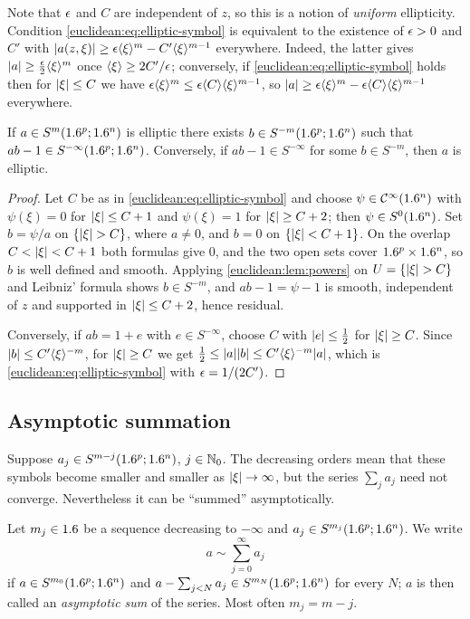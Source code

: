 Note that $\epsilon$ and $C$ are independent of $z$, so this is a notion of
\emph{uniform} ellipticity. Condition \eqref{euclidean:eq:elliptic-symbol} is
equivalent to the existence of $\epsilon>0$ and $C'$ with
$\lvert a(z,\xi)\rvert\ge\epsilon\langle \xi\rangle^m-C'\langle \xi\rangle^{m-1}$ everywhere. Indeed, the
latter gives $\lvert a\rvert\ge\frac{\epsilon}2\langle \xi\rangle^m$ once $\langle \xi\rangle\ge2C'/\epsilon$;
conversely, if \eqref{euclidean:eq:elliptic-symbol} holds then for
$\lvert \xi\rvert\le C$ we have $\epsilon\langle \xi\rangle^m\le\epsilon\langle C\rangle\langle \xi\rangle^{m-1}$, so
$\lvert a\rvert\ge\epsilon\langle \xi\rangle^m-\epsilon\langle C\rangle\langle \xi\rangle^{m-1}$ everywhere.

\begin{lemma}\label{euclidean:lem:elliptic-symbol}
  If $a\in S^m(1.6^p;1.6^n)$ is elliptic there exists
  $b\in S^{-m}(1.6^p;1.6^n)$ such that $ab-1\in S^{-\infty}(1.6^p;1.6^n)$.
  Conversely, if $ab-1\in S^{-\infty}$ for some $b\in S^{-m}$, then $a$ is
  elliptic.
\end{lemma}
\begin{proof}
  Let $C$ be as in \eqref{euclidean:eq:elliptic-symbol} and choose
  $\psi\in\mathcal{C}^\infty(1.6^n)$ with $\psi(\xi)=0$ for $\lvert \xi\rvert\le C+1$ and
  $\psi(\xi)=1$ for $\lvert \xi\rvert\ge C+2$; then $\psi\in S^0(1.6^n)$. Set
  $b=\psi/a$ on $\{\lvert \xi\rvert>C\}$, where $a\ne0$, and $b=0$ on
  $\{\lvert \xi\rvert<C+1\}$. On the overlap $C<\lvert \xi\rvert<C+1$ both formulas give $0$, and
  the two open sets cover $1.6^p\times1.6^n$, so $b$ is well defined and smooth. Applying \cref{euclidean:lem:powers} on
  $U=\{\lvert \xi\rvert>C\}$ and Leibniz' formula shows $b\in S^{-m}$, and
  $ab-1=\psi-1$ is smooth, independent of $z$ and supported in
  $\lvert \xi\rvert\le C+2$, hence residual.

  Conversely, if $ab=1+e$ with $e\in S^{-\infty}$, choose $C$ with
  $\lvert e\rvert\le\frac12$ for $\lvert \xi\rvert\ge C$. Since $\lvert b\rvert\le C'\langle \xi\rangle^{-m}$, for
  $\lvert \xi\rvert\ge C$ we get
  $\frac12\le\lvert a\rvert\lvert b\rvert\le C'\langle \xi\rangle^{-m}\lvert a\rvert$, which is
  \eqref{euclidean:eq:elliptic-symbol} with $\epsilon=1/(2C')$.
\end{proof}

\subsection{Asymptotic summation}

Suppose $a_j\in S^{m-j}(1.6^p;1.6^n)$, $j\in\mathbb{N}_0$. The decreasing orders mean
that these symbols become smaller and smaller as $\lvert \xi\rvert\to\infty$, but the
series $\sum_ja_j$ need not converge. Nevertheless it can be ``summed''
asymptotically.

\begin{definition}\label{euclidean:def:asymptotic-sum}
  Let $m_j\in1.6$ be a sequence decreasing to $-\infty$ and
  $a_j\in S^{m_j}(1.6^p;1.6^n)$. We write
  \begin{equation*}
    a\sim\sum_{j=0}^\infty a_j
  \end{equation*}
  if $a\in S^{m_0}(1.6^p;1.6^n)$ and
  $a-\sum_{j<N}a_j\in S^{m_N}(1.6^p;1.6^n)$ for every $N$; $a$ is then called
  an \emph{asymptotic sum} of the series. Most often $m_j=m-j$.
\end{definition}

